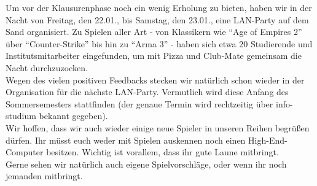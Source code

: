 Um vor der Klausurenphase noch ein wenig Erholung zu bieten, haben wir in der Nacht von Freitag, den 22.01., bis Samstag, den 23.01., eine LAN-Party auf dem Sand organisiert. Zu Spielen aller Art - von Klassikern wie “Age of Empires 2” über “Counter-Strike” bis hin zu “Arma 3” - haben sich etwa 20 Studierende und Institutsmitarbeiter eingefunden, um mit Pizza und Club-Mate gemeinsam die Nacht durchzuzocken.\\
Wegen des vielen positiven Feedbacks stecken wir natürlich schon wieder in der Organisation für die nächste LAN-Party. Vermutlich wird diese Anfang des Sommersemesters stattfinden (der genaue Termin wird rechtzeitig über info-studium bekannt gegeben).\\
Wir hoffen, dass wir auch wieder einige neue Spieler in unseren Reihen begrüßen dürfen. Ihr müsst euch weder mit Spielen auskennen noch einen High-End-Computer besitzen. Wichtig ist vorallem, dass ihr gute Laune mitbringt.\\
Gerne sehen wir natürlich auch eigene Spielvorschläge, oder wenn ihr noch jemanden mitbringt.